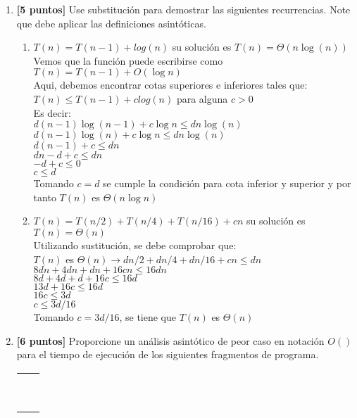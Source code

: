 \documentclass[10pt]{article}
\newcommand{\Ot}[1]{O\left(#1\right)}
\begin{document}
\begin{enumerate}
\item \textbf{[5 puntos]} Use substitución para demostrar las siguientes recurrencias. Note que debe aplicar las definiciones asintóticas. 

\begin{enumerate}
  \item $T(n) = T(n-1) + log(n)$ su solución es $T(n) = \Theta(n\log(n))$\\
  Vemos que la función puede escribirse como $T(n) = T(n-1) + O(\log n)$\\
  Aqui, debemos encontrar cotas superiores e inferiores tales que:\\
  $T(n)\leq T(n-1) + clog(n)$ para alguna $c>0$\\
  Es decir:\\$d(n-1)\log(n-1)+c\log n\leq dn\log(n)$\\
  $d(n-1)\log(n)+c\log n\leq dn\log(n)$\\$d(n-1)+c\leq dn$\\$dn-d+c\leq dn$\\
  $-d+c\leq0$\\$c\leq d$\\Tomando $c=d$ se cumple la condición para cota inferior y superior y por tanto $T(n)$ es $\Theta(n\log n)$\\
  \item $T(n) = T(n/2) + T(n/4) + T(n/16) +cn$ su solución es $T(n) = \Theta(n)$\\
  Utilizando sustitución, se debe comprobar que:\\
  $T(n)$ es $\Theta(n)\rightarrow dn/2+dn/4+dn/16+cn\leq dn$\\$8dn+4dn+dn+16cn\leq 16dn$\\$8d+4d+d+16c\leq 16d$\\$13d+16c\leq 16d$\\$16c\leq 3d$\\$c\leq 3d/16$\\
  Tomando $c=3d/16$, se tiene que $T(n)$ es $\Theta(n)$
\end{enumerate}


\item \textbf{[6 puntos]} Proporcione un análisis asintótico de peor caso en notación $\Ot{}$ para el tiempo de ejecución de los siguientes fragmentos de programa.

\begin{scriptsize}
\begin{tabular}{ll}
\begin{minipage}{3in}
\begin{verbatim}


\end{verbatim}
\end{minipage}
\end{tabular}
\end{scriptsize}
\end{enumerate}
\end{document}
